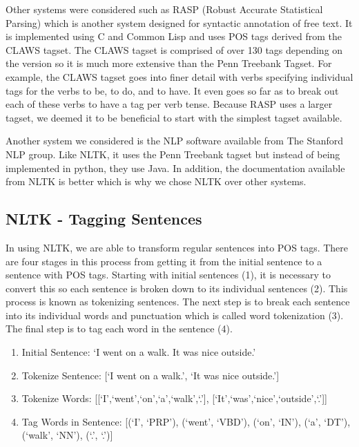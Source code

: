 \documentclass[11pt,a4paper]{article}
\begin{document}
\begin{multicols}{2}
Other systems were considered such as RASP (Robust Accurate Statistical Parsing) which is another system designed for syntactic annotation of free text. \cite{briscoe} It is implemented using C and Common Lisp and uses POS tags derived from the CLAWS tagset. The CLAWS tagset is comprised of over 130 tags depending on the version so it is much more extensive than the Penn Treebank Tagset. For example, the CLAWS tagset goes into finer detail with verbs specifying individual tags for the verbs to be, to do, and to have. It even goes so far as to break out each of these verbs to have a tag per verb tense. Because RASP uses a larger tagset, we deemed it to be beneficial to start with the simplest tagset available.

Another system we considered is the NLP software available from The Stanford NLP group. Like NLTK, it uses the Penn Treebank tagset but instead of being implemented in python, they use Java. In addition, the documentation available from NLTK is better which is why we chose NLTK over other systems.

\subsection{NLTK - Tagging Sentences}
In using NLTK, we are able to transform regular sentences into POS tags. There are four stages in this process from getting it from the initial sentence to a sentence with POS tags. Starting with initial sentences (1), it is necessary to convert this so each sentence is broken down to its individual sentences (2). This process is known as tokenizing sentences. The next step is to break each sentence into its individual words and punctuation which is called word tokenization (3). The final step is to tag each word in the sentence (4).

\begin{enumerate}
   \item Initial Sentence: `I went on a walk. It was nice outside.'
   \item Tokenize Sentence: [`I went on a walk.', `It was nice outside.']
   \item Tokenize Words: [[`I',`went',`on',`a',`walk',`.'], [`It',`was',`nice',`outside',`.']]
   \item Tag Words in Sentence: [(`I', `PRP'), (`went', `VBD'), (`on', `IN'), (`a', `DT'), (`walk', `NN'), (`.', `.')]
\end{enumerate}



\end{multicols}
\end{document}
